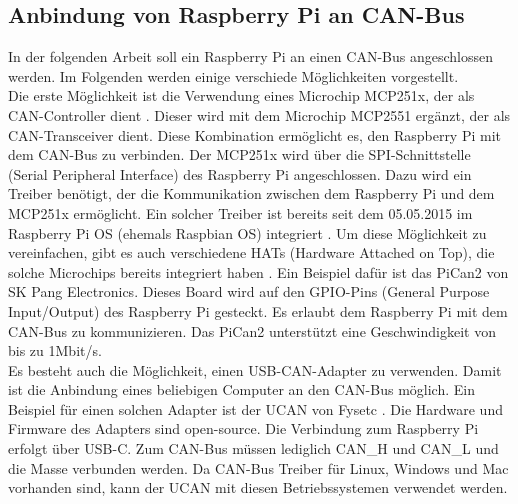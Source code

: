 \subsection{Anbindung von Raspberry Pi an CAN-Bus}
In der folgenden Arbeit soll ein Raspberry Pi an einen CAN-Bus angeschlossen werden. 
Im Folgenden werden einige verschiede Möglichkeiten vorgestellt.\\
Die erste Möglichkeit ist die Verwendung eines Microchip MCP251x, der als CAN-Controller dient \cite{Salunkhe2016}. Dieser wird 
mit dem Microchip MCP2551 ergänzt, der als CAN-Transceiver dient. Diese Kombination ermöglicht es, den
Raspberry Pi mit dem CAN-Bus zu verbinden. Der MCP251x wird über die SPI-Schnittstelle (Serial Peripheral Interface) 
des Raspberry Pi angeschlossen. Dazu wird ein Treiber benötigt, der die Kommunikation zwischen dem Raspberry Pi und dem
MCP251x ermöglicht. Ein solcher Treiber ist bereits seit dem 05.05.2015 im Raspberry Pi OS (ehemals Raspbian OS)
integriert \cite{Salunkhe2016}. 
Um diese Möglichkeit zu vereinfachen, gibt es auch verschiedene HATs (Hardware Attached on Top), die solche Microchips
bereits integriert haben \cite{Pant2019}. Ein Beispiel dafür ist das PiCan2 von SK Pang Electronics. Dieses Board wird auf den 
GPIO-Pins (General Purpose Input/Output) des Raspberry Pi gesteckt. Es erlaubt dem Raspberry Pi mit dem CAN-Bus
zu kommunizieren. Das PiCan2 unterstützt eine Geschwindigkeit von bis zu 1Mbit/s. \\
Es besteht auch die Möglichkeit, einen USB-CAN-Adapter zu verwenden. Damit ist die Anbindung eines 
beliebigen Computer an den CAN-Bus möglich.
Ein Beispiel für einen solchen Adapter ist der UCAN von Fysetc \cite{FysetcUCAN}. 
Die Hardware und Firmware des Adapters
sind open-source. Die Verbindung zum Raspberry Pi erfolgt über USB-C.
Zum CAN-Bus müssen lediglich CAN\_H und CAN\_L und die Masse verbunden werden. Da CAN-Bus Treiber für Linux, Windows und Mac
vorhanden sind, kann der UCAN mit diesen Betriebssystemen verwendet werden. 



